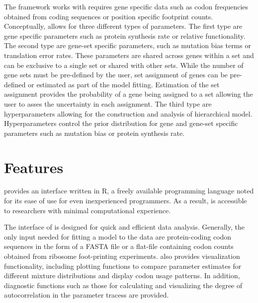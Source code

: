 The \package framework works with \package requires gene specific data such as codon frequencies obtained from coding sequences or position specific footprint counts.
Conceptually, \package allows for three different types of parameters.
The first type are gene specific parameters such as protein synthesis rate or relative functionality.
The second type are gene-set specific parameters, such as mutation bias terms or translation error rates.
These parameters are shared across genes within a set and can be exclusive to a single set or shared with other sets.
While the number of gene sets must be pre-defined by the user, set assignment of genes can be pre-defined or estimated as part of the model fitting.
Estimation of the set assignment provides the probability of a gene being assigned to a set allowing the user to asses the uncertainty in each assignment.
The third type are hyperparameters allowing for the construction and analysis of hierarchical model. Hyperparameters control the prior distribution for gene and gene-set specific parameters such as mutation bias or protein synthesis rate.

\section{Features}
\package provides an interface written in R, a freely available programming language noted for its ease of use for even inexperienced programmers. 
As a result, \package is accessible to researchers with minimal computational experience. 

The interface of \package is designed for quick and efficient data analysis.
Generally, the only input needed for fitting a model to the data are protein-coding codon sequences in the form of a FASTA file or a flat-file containing codon counts obtained from ribosome foot-printing experiments. 
\package also provides visualization functionality, including plotting functions to compare parameter estimates for different mixture distributions and display codon usage patterns. 
In addition, diagnostic functions such as those for calculating and visualizing the degree of autocorrelation in the parameter tracess are provided.

